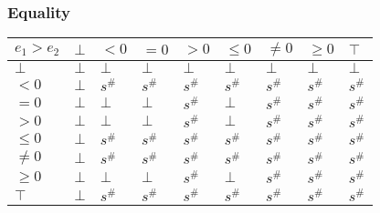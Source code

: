 \documentclass{beamer}
\begin{document}
                \begin{frame}
                    \frametitle{Equality}
                \begin{table}
                    \begin{tabular}{|l|l|l|l|l|l|l|l|l|}
                    \hline
                    $e_1 > e_2$ & $\bot$ & $<0$   & $=0$   & $>0$   & $\le 0$ & $\ne 0$ & $\ge 0$ & $\top$ \\ \hline
                    $\bot$      & $\bot$ & $\bot$ & $\bot$ & $\bot$ & $\bot$  & $\bot$  & $\bot$  & $\bot$ \\ \hline
                    $<0$        & $\bot$ & $s^\#$ & $s^\#$ & $s^\#$ & $s^\#$  & $s^\#$  & $s^\#$  & $s^\#$ \\ \hline
                    $=0$        & $\bot$ & $\bot$ & $\bot$ & $s^\#$ & $\bot$  & $s^\#$  & $s^\#$  & $s^\#$ \\ \hline
                    $>0$        & $\bot$ & $\bot$ & $\bot$ & $s^\#$ & $\bot$  & $s^\#$  & $s^\#$  & $s^\#$ \\ \hline
                    $\le 0$     & $\bot$ & $s^\#$ & $s^\#$ & $s^\#$ & $s^\#$  & $s^\#$  & $s^\#$  & $s^\#$ \\ \hline
                    $\ne 0$     & $\bot$ & $s^\#$ & $s^\#$ & $s^\#$ & $s^\#$  & $s^\#$  & $s^\#$  & $s^\#$ \\ \hline
                    $\ge 0$     & $\bot$ & $\bot$ & $\bot$ & $s^\#$ & $\bot$  & $s^\#$  & $s^\#$  & $s^\#$ \\ \hline
                    $\top$      & $\bot$ & $s^\#$ & $s^\#$ & $s^\#$ & $s^\#$  & $s^\#$  & $s^\#$  & $s^\#$ \\ \hline
                    \end{tabular}
                    \end{table}
                \end{frame}
\end{document}
